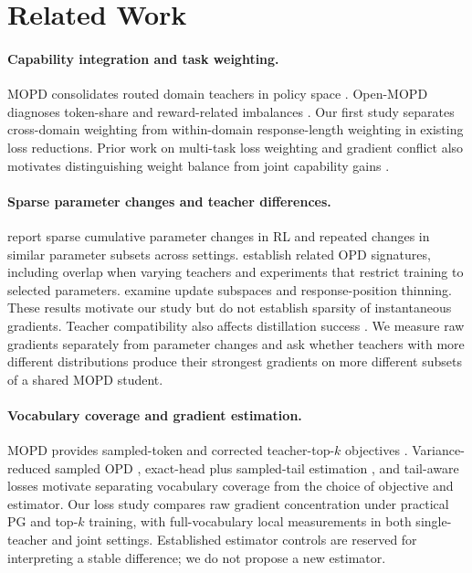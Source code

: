 \section{Related Work}

\paragraph{Capability integration and task weighting.}
MOPD consolidates routed domain teachers in policy space
\citep{ma2026mopdmultiteacheronpolicydistillation}.
Open-MOPD diagnoses token-share and reward-related imbalances
\citep{gao2026openmopddiagnosingfixingcapability}.
Our first study separates cross-domain weighting from within-domain
response-length weighting in existing loss reductions.
Prior work on multi-task loss weighting and gradient conflict also
motivates distinguishing weight balance from joint capability gains
\citep{chen2018gradnorm,yu2020gradientsurgerymultitasklearning}.

\paragraph{Sparse parameter changes and teacher differences.}
\citet{mukherjee2025subnetworks} report sparse cumulative parameter changes
in RL and repeated changes in similar parameter subsets across settings.
\citet{yu2026denseupdates} establish related OPD signatures, including
overlap when varying teachers and experiments that restrict training
to selected parameters. \citet{shen2026opdgeometry} examine update
subspaces and response-position thinning. These results motivate our
study but do not establish sparsity of instantaneous gradients.
Teacher compatibility also affects distillation success
\citep{li2026rethinkingopd,ma2026mopdmultiteacheronpolicydistillation}.
We measure raw gradients separately from parameter changes and ask
whether teachers with more different distributions produce their
strongest gradients on more different subsets of a shared MOPD student.

\paragraph{Vocabulary coverage and gradient estimation.}
MOPD provides sampled-token and corrected teacher-top-$k$ objectives
\citep{ma2026mopdmultiteacheronpolicydistillation}.
Variance-reduced sampled OPD \citep{oh2026vopd}, exact-head plus
sampled-tail estimation \citep{zhang2026emapg}, and tail-aware losses
\citep{huang2026tailaware} motivate separating vocabulary coverage from
the choice of objective and estimator. Our loss study compares raw
gradient concentration under practical PG and top-$k$ training, with
full-vocabulary local measurements in both single-teacher and joint
settings. Established estimator controls are reserved for interpreting
a stable difference; we do not propose a new estimator.
